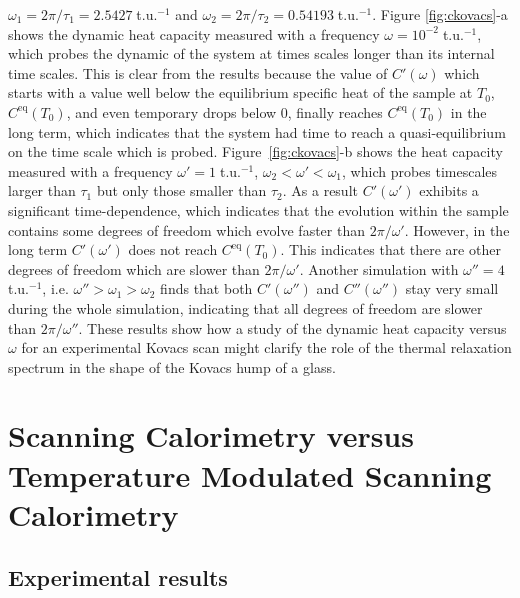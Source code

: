 \documentclass[pre,a4paper,twocolumn,superscriptaddress,%
floatfix]{revtex4}
\begin{document}
$\omega_1 = 2 \pi / \tau_1 = 2.5427\;$t.u.$^{-1}$ and
$\omega_2 = 2 \pi / \tau_2 = 0.54193\;$t.u.$^{-1}$. Figure \ref{fig:ckovacs}-a
shows the dynamic heat capacity measured with a frequency $\omega =
10^{-2}\;$t.u.$^{-1}$, which probes the dynamic of the system at times
scales longer than its internal time scales. This is clear from
the results because
the value of $C'(\omega)$ which starts with a value well below the equilibrium
specific heat of the sample at $T_0$, $C^{\mathrm{eq}}(T_0)$, and even
temporary drops below $0$, finally reaches  $C^{\mathrm{eq}}(T_0)$ in the long
term, which indicates that the system had time to reach
a quasi-equilibrium on the time scale which is probed.
Figure~\ref{fig:ckovacs}-b shows the heat capacity
measured with a frequency $\omega' = 1\;$t.u.$^{-1}$,
$\omega_2 < \omega' <\omega_1$, 
which probes timescales larger than $\tau_1$ but only those smaller
than $\tau_2$. As a
result $C'(\omega')$ exhibits a
significant time-dependence, which indicates that the evolution within the
sample contains some
degrees of freedom which evolve faster than $2 \pi / \omega'$. However, in the
long term $C'(\omega')$ does not reach  $C^{\mathrm{eq}}(T_0)$. This indicates
that there are other degrees of freedom which are slower than $2 \pi /
\omega'$. Another simulation with $\omega'' = 4\;$t.u.$^{-1}$, i.e.
$\omega'' > \omega_1 > \omega_2$ finds that both $C'(\omega'')$
and $C''(\omega'')$
stay very small during the whole simulation, indicating that all degrees of
freedom are slower than $2 \pi / \omega''$. These results show how a study
of the dynamic heat capacity versus $\omega$ for an
experimental Kovacs scan might
clarify the role of the thermal relaxation spectrum in the shape of the Kovacs
hump of a glass.

  
\section{Scanning Calorimetry versus Temperature Modulated
  Scanning Calorimetry}
\label{sec:tmdsc}

\subsection{Experimental results}
\label{sec:experimental}
\end{document}

